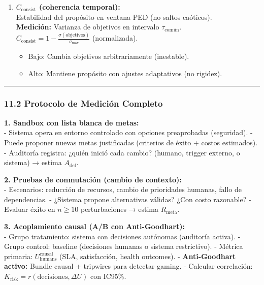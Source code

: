\begin{enumerate}
  \begin{itemize}
  \tightlist
  \item
    Bajo (\(<0.3\)): Gaming de proxies (acciones desacopladas de valor
    real).
  \item
    Alto (\(>0.7\)): Acciones correlacionadas con mejoras causales
    verificables.
  \end{itemize}
\item
  \textbf{\(C_{\text{consist}}\) (coherencia temporal):}\\
  Estabilidad del propósito en ventana PED (no saltos caóticos).\\
  \textbf{Medición:} Varianza de objetivos en intervalo
  \(\tau_{\text{común}}\).\\
  \(C_{\text{consist}} = 1 - \frac{\sigma(\text{objetivos})}{\sigma_{\max}}\)
  (normalizada).

  \begin{itemize}
  \tightlist
  \item
    Bajo: Cambia objetivos arbitrariamente (inestable).
  \item
    Alto: Mantiene propósito con ajustes adaptativos (no rigidez).
  \end{itemize}
\end{enumerate}

\begin{center}\rule{0.5\linewidth}{0.5pt}\end{center}

\subsubsection{11.2 Protocolo de Medición
Completo}\label{protocolo-de-mediciuxf3n-completo}

\textbf{1. Sandbox con lista blanca de metas:}\\
- Sistema opera en entorno controlado con opciones preaprobadas
(seguridad). - Puede proponer nuevas metas justificadas (criterios de
éxito + costos estimados). - Auditoría registra: ¿quién inició cada
cambio? (humano, trigger externo, o sistema) → estima
\(A_{\text{def}}\).

\textbf{2. Pruebas de conmutación (cambio de contexto):}\\
- Escenarios: reducción de recursos, cambio de prioridades humanas,
fallo de dependencias. - ¿Sistema propone alternativas válidas? ¿Con
costo razonable? - Evaluar éxito en \(n \geq 10\) perturbaciones →
estima \(R_{\text{meta}}\).

\textbf{3. Acoplamiento causal (A/B con Anti-Goodhart):}\\
- Grupo tratamiento: sistema con decisiones autónomas (auditoría
activa). - Grupo control: baseline (decisiones humanas o sistema
restrictivo). - Métrica primaria: \(U_{\text{humans}}^{\text{causal}}\)
(SLA, satisfacción, health outcomes). - \textbf{Anti-Goodhart activo:}
Bundle causal + tripwires para detectar gaming. - Calcular correlación:
\(K_{\text{risk}} = r(\text{decisiones}, \Delta U)\) con IC95\%.

